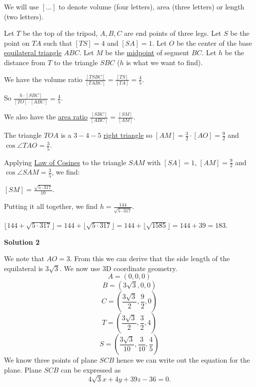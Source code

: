 \begin{enumerate}
 We will use $[...]$ to denote volume (four letters), area (three letters) or length (two letters).

 Let $T$ be the top of the tripod, $A,B,C$ are end points of three legs. Let $S$ be the point on $TA$ such that $[TS] = 4$ and $[SA] = 1$. Let $O$ be the center of the base \href{https://artofproblemsolving.com/wiki/index.php?title=Equilateral\_triangle}{equilateral triangle} $ABC$. Let $M$ be the \href{https://artofproblemsolving.com/wiki/index.php?title=Midpoint}{midpoint} of segment $BC$. Let $h$ be the distance from $T$ to the triangle $SBC$ ($h$ is what we want to find).

 We have the volume ratio $\frac {[TSBC]}{[TABC]} = \frac {[TS]}{[TA]} = \frac {4}{5}$.

 So $\frac {h\cdot [SBC]}{[TO]\cdot [ABC]} = \frac {4}{5}$.

 We also have the \href{https://artofproblemsolving.com/wiki/index.php?title=Area\_ratios}{area ratio} $\frac {[SBC]}{[ABC]} = \frac {[SM]}{[AM]}$.

 The triangle $TOA$ is a $3-4-5$ \href{https://artofproblemsolving.com/wiki/index.php?title=Right\_triangle}{right triangle} so $[AM] = \frac {3}{2}\cdot[AO] = \frac {9}{2}$ and $\cos{\angle{TAO}} = \frac {3}{5}$.

 Applying \href{https://artofproblemsolving.com/wiki/index.php?title=Law\_of\_Cosines}{Law of Cosines} to the triangle $SAM$ with $[SA] = 1$, $[AM] = \frac {9}{2}$ and $\cos{\angle{SAM}} = \frac {3}{5}$, we find:

 $[SM] = \frac {\sqrt {5\cdot317}}{10}.$

 Putting it all together, we find $h = \frac {144}{\sqrt {5\cdot317}}$.

 $\lfloor 144+\sqrt{5 \cdot 317}\rfloor =144+ \lfloor \sqrt{5 \cdot 317}\rfloor =144+\lfloor \sqrt{1585} \rfloor =144+39=\boxed{183}$.

 



\textbf{Solution 2}

We note that $AO=3$. From this we can derive that the side length of the equilateral is $3\sqrt{3}$. We now use 3D coordinate geometry. 
 \[A = (0,0,0)\] 
 \[B = (3\sqrt{3},0,0)\] 
 \[C = (\frac{3\sqrt{3}}{2}, \frac{9}{2}, 0)\] 
 \[T = (\frac{3\sqrt{3}}{2}, \frac{3}{2}, 4)\] 
 \[S= (\frac{3\sqrt{3}}{10}, \frac{3}{10}, \frac{4}{5})\]We know three points of plane $SCB$ hence we can write out the equation for the plane. Plane $SCB$ can be expressed as 
 \[4\sqrt{3}x+4y+39z-36=0.\]


\end{enumerate}
